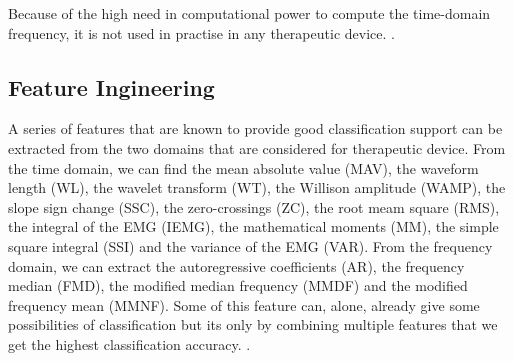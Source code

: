 \documentclass{article}
\begin{document}
Because of the high need in computational power to compute the time-domain frequency, it is not used in practise in any therapeutic device. \cite{ref:classification4}.



\subsection{Feature Ingineering}
A series of features that are known to provide good classification support can be extracted from the two domains that are considered for therapeutic device. From the time domain, we can find the mean absolute value (MAV), the waveform length (WL), the wavelet transform (WT), the Willison amplitude (WAMP), the slope sign change (SSC), the zero-crossings (ZC), the root meam square (RMS), the integral of the EMG (IEMG), the mathematical moments (MM), the simple square integral (SSI) and the variance of the EMG (VAR). From the frequency domain, we can extract the autoregressive coefficients (AR), the frequency median (FMD), the modified median frequency (MMDF) and the modified frequency mean (MMNF). Some of this feature can, alone, already give some possibilities of classification but its only by combining multiple features that we get the highest classification accuracy. \cite{ref:classification1, ref:classification2, ref:classification3, ref:classification4}.
\end{document}

